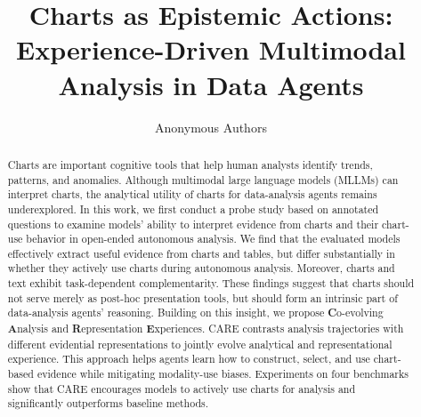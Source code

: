 \documentclass{article}
\title{Charts as Epistemic Actions: Experience-Driven Multimodal Analysis in Data Agents}
\author{Anonymous Authors}
\begin{document}
\maketitle

\begin{abstract}

  
  Charts are important cognitive tools that help human analysts identify trends, patterns, and anomalies. Although multimodal large language models (MLLMs) can interpret charts, the analytical utility of charts for data-analysis agents remains underexplored. In this work, we first conduct a probe study based on annotated questions to examine models' ability to interpret evidence from charts and their chart-use behavior in open-ended autonomous analysis. We find that the evaluated models effectively extract useful evidence from charts and tables, but differ substantially in whether they actively use charts during autonomous analysis. Moreover, charts and text exhibit task-dependent complementarity. These findings suggest that charts should not serve merely as post-hoc presentation tools, but should form an intrinsic part of data-analysis agents' reasoning. Building on this insight, we propose \textbf{C}o-evolving \textbf{A}nalysis and \textbf{R}epresentation \textbf{E}xperiences. \textsc{CARE} contrasts analysis trajectories with different evidential representations to jointly evolve analytical and representational experience. This approach helps agents learn how to construct, select, and use chart-based evidence while mitigating modality-use biases. Experiments on four benchmarks show that \textsc{CARE} encourages models to actively use charts for analysis and significantly outperforms baseline methods.
\end{abstract}
\end{document}
